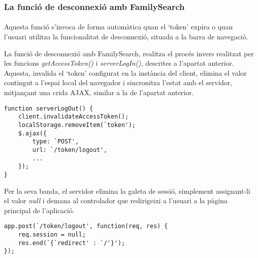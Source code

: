 \subsubsection{La funció de desconnexió amb FamilySearch}

\paragraph{}
Aquesta funció s'invoca de forma automàtica quan el `token' expira o quan l'usuari utilitza la funcionalitat de desconnexió, situada a la barra de navegació.

La funció de desconnexió amb FamilySearch, realitza el procés invers realitzat per les funcions \emph{getAccessToken()} i \emph{serverLogIn()}, descrites a l'apartat anterior. Aquesta, invalida el `token' configurat en la instància del client, elimina el valor contingut a l'espai local del navegador i sincronitza l'estat amb el servidor, mitjançant una crida AJAX, similar a la de l'apartat anterior.

\begin{lstlisting}[style=rawOwn,caption={Cridar AJAX al servidor per indicar que l'usuari s'ha desconnectat}]
function serverLogOut() {
    client.invalidateAccessToken();
    localStorage.removeItem(`token');
    $.ajax({
        type: `POST',
        url: `/token/logout',
        ...
    });
}
\end{lstlisting}

Per la seva banda, el servidor elimina la galeta de sessió, simplement assignant-li el valor \emph{null} i demana al controlador que redirigeixi a l'usuari a la pàgina principal de l'aplicació.

\begin{lstlisting}[style=rawOwn,caption={Petició POST de desconnexió processada pel servidor}]
app.post(`/token/logout', function(req, res) {
    req.session = null;
    res.end(`{`redirect' : `/'}');
});
\end{lstlisting}
